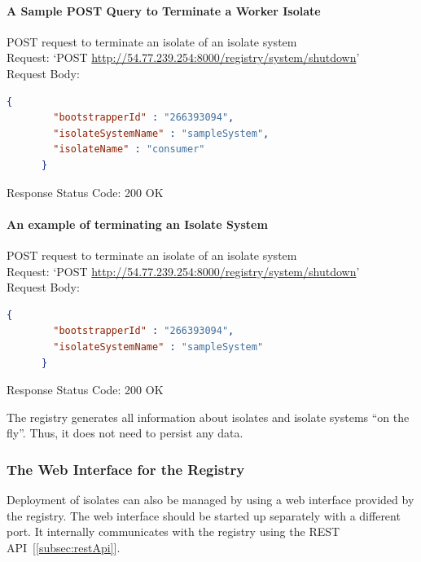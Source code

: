 \paragraph{A Sample POST Query to Terminate a Worker Isolate}
  \begin{description}
    \item{POST request to terminate an isolate of an isolate system}\\
    Request: ‘POST \url{http://54.77.239.254:8000/registry/system/shutdown}’\\
    Request Body:
    \begin{lstlisting}[language=json,firstnumber=1]
      {
        "bootstrapperId" : "266393094",
        "isolateSystemName" : "sampleSystem",
        "isolateName" : "consumer"
      }
    \end{lstlisting}
    Response Status Code: 200 OK
  \end{description}

\paragraph{An example of terminating an Isolate System}
  \begin{description}
    \item{POST request to terminate an isolate of an isolate system}\\
    Request: ‘POST \url{http://54.77.239.254:8000/registry/system/shutdown}’\\
    Request Body:
    \begin{lstlisting}[language=json,firstnumber=1]
      {
        "bootstrapperId" : "266393094",
        "isolateSystemName" : "sampleSystem"
      }
    \end{lstlisting}
    Response Status Code: 200 OK
  \end{description}

The registry generates all information about isolates and isolate systems “on the fly”. Thus, it does not need to persist any data.

  \subsubsection{The Web Interface for the Registry}
  \label{subsubsection:registryWebInterface}
  Deployment of isolates can also be managed by using a web interface provided by the registry. The web interface should be started up separately with a different port. It internally communicates with the registry using the REST API~[\ref{subsec:restApi}].

